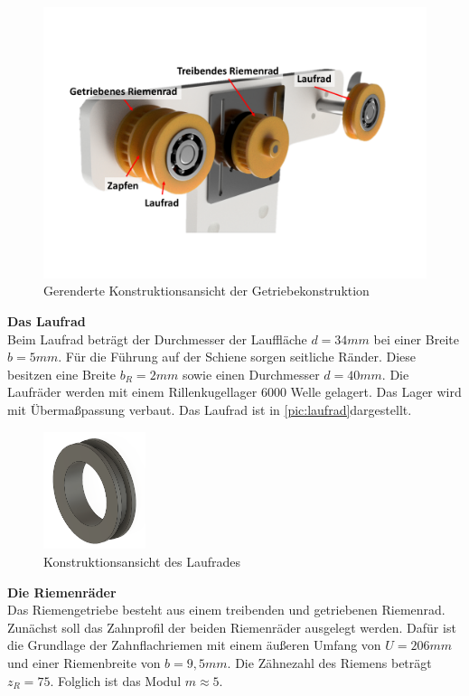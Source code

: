 \begin{figure}[h]
	\begin{center}
		\includegraphics[width=12cm]{getriebe.pdf}
		\caption{Gerenderte Konstruktionsansicht der Getriebekonstruktion}
		\label{pic:getriebe}
	\end{center}
\end{figure} 



\textbf{Das Laufrad}\\
Beim Laufrad beträgt der Durchmesser der Lauffläche $d=34mm$ bei einer Breite $b=5mm$. Für die Führung auf der Schiene sorgen seitliche Ränder. Diese besitzen eine Breite $b_R=2mm$ sowie einen Durchmesser $d=40mm$. Die Laufräder werden mit einem Rillenkugellager 6000 Welle gelagert. Das Lager wird mit Übermaßpassung verbaut. Das Laufrad ist in \autoref{pic:laufrad}dargestellt. \\

\begin{figure}[h]
	\centering
	\includegraphics[width=3cm]{laufrad.png}
	\caption{Konstruktionsansicht des Laufrades}
	\label{pic:laufrad}
\end{figure}
\newpage

\textbf{Die Riemenräder}\\   
Das Riemengetriebe besteht aus einem treibenden und getriebenen Riemenrad. Zunächst soll das Zahnprofil der beiden Riemenräder ausgelegt werden. Dafür ist die Grundlage der Zahnflachriemen mit einem äußeren Umfang von $U = 206mm$ und einer Riemenbreite von $b=9,5mm$. Die Zähnezahl des Riemens beträgt $z_R=75$. Folglich ist das Modul $m \approx 5$. \\

